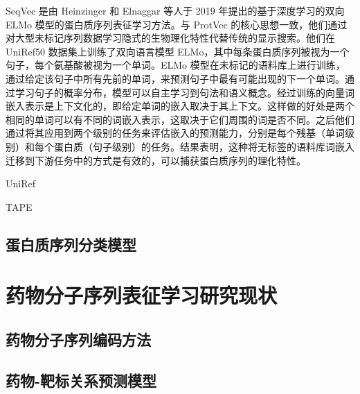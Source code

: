 SeqVec \cite{heinzinger2019modeling} 是由 Heinzinger 和 Elnaggar 等人于 2019 年提出的基于深度学习的双向 ELMo \cite{peters1802deep} 模型的蛋白质序列表征学习方法。与 ProtVec 的核心思想一致，他们通过对大型未标记序列数据学习隐式的生物理化特性代替传统的显示搜索。他们在 UniRef50 数据集上训练了双向语言模型 ELMo，其中每条蛋白质序列被视为一个句子，每个氨基酸被视为一个单词。ELMo 模型在未标记的语料库上进行训练，通过给定该句子中所有先前的单词，来预测句子中最有可能出现的下一个单词。通过学习句子的概率分布，模型可以自主学习到句法和语义概念。经过训练的向量词嵌入表示是上下文化的，即给定单词的嵌入取决于其上下文。这样做的好处是两个相同的单词可以有不同的词嵌入表示，这取决于它们周围的词是否不同。之后他们通过将其应用到两个级别的任务来评估嵌入的预测能力，分别是每个残基（单词级别）和每个蛋白质（句子级别）的任务。结果表明，这种将无标签的语料库词嵌入迁移到下游任务中的方式是有效的，可以捕获蛋白质序列的理化特性。

UniRef

TAPE 


\subsection{蛋白质序列分类模型}



\section{药物分子序列表征学习研究现状}

\subsection{药物分子序列编码方法}


\subsection{药物-靶标关系预测模型}





